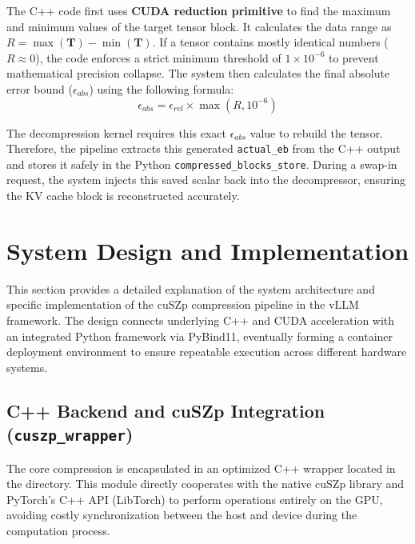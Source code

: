 \documentclass{polyu-comp}
\begin{document}
The C++ code first uses \textbf{CUDA reduction primitive} to find the maximum and minimum values of the target tensor block. It calculates the data range as $R = \max(\mathbf{T}) - \min(\mathbf{T})$. If a tensor contains mostly identical numbers ($R \approx 0$), the code enforces a strict minimum threshold of $1 \times 10^{-6}$ to prevent mathematical precision collapse. The system then calculates the final absolute error bound ($\epsilon_{abs}$) using the following formula:
\begin{equation}
    \epsilon_{abs} = \epsilon_{rel} \times \max(R, 10^{-6})
\end{equation}

The decompression kernel requires this exact $\epsilon_{abs}$ value to rebuild the tensor. Therefore, the pipeline extracts this generated \texttt{actual\_eb} from the C++ output and stores it safely in the Python \texttt{compressed\_blocks\_store}. During a swap-in request, the system injects this saved scalar back into the decompressor, ensuring the KV cache block is reconstructed accurately.


\section{System Design and Implementation}
\label{sec:system_design_implementation}

This section provides a detailed explanation of the system architecture and specific implementation of the cuSZp compression pipeline in the vLLM framework. The design connects underlying C++ and CUDA acceleration with an integrated Python framework via PyBind11, eventually forming a container deployment environment to ensure repeatable execution across different hardware systems.

\subsection{C++ Backend and cuSZp Integration (\texttt{cuszp\_wrapper})}
\label{subsec:cpp_backend}

The core compression is encapsulated in an optimized C++ wrapper located in the  directory. This module directly cooperates with the native cuSZp library and PyTorch's C++ API (LibTorch) to perform operations entirely on the GPU, avoiding costly synchronization between the host and device during the computation process.
\end{document}

